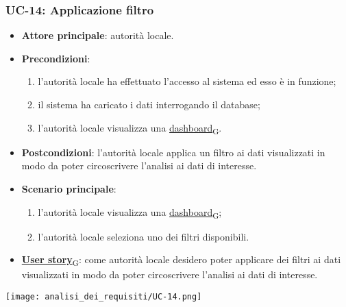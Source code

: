 \newpage

\subsubsection{UC-14: Applicazione filtro}
\begin{itemize}
	\item \textbf{Attore principale}: autorità locale.
	\item \textbf{Precondizioni}:
	      \begin{enumerate}
		      \item l'autorità locale ha effettuato l'accesso al sistema ed esso è in funzione;
		      \item il sistema ha caricato i dati interrogando il database;
		      \item l'autorità locale visualizza una \href{https://7last.github.io/docs/rtb/documentazione-interna/glossario\#dashboard}{dashboard\textsubscript{G}}.
	      \end{enumerate}
	\item \textbf{Postcondizioni}: l'autorità locale applica un filtro ai dati visualizzati in modo da poter circoscrivere l'analisi ai dati di interesse.
	\item \textbf{Scenario principale}:
	      \begin{enumerate}
		      \item l'autorità locale visualizza una \href{https://7last.github.io/docs/rtb/documentazione-interna/glossario\#dashboard}{dashboard\textsubscript{G}};
		      \item l'autorità locale seleziona uno dei filtri disponibili.
	      \end{enumerate}
	\item \href{https://7last.github.io/docs/rtb/documentazione-interna/glossario\#user-story}{\textbf{User story}\textsubscript{G}}:
	      come autorità locale desidero poter applicare dei filtri ai dati visualizzati in modo da poter circoscrivere l'analisi ai dati di interesse.
\end{itemize}
\begin{center}
	\texttt{[image: analisi\_dei\_requisiti/UC-14.png]}
\end{center}

\newpage

